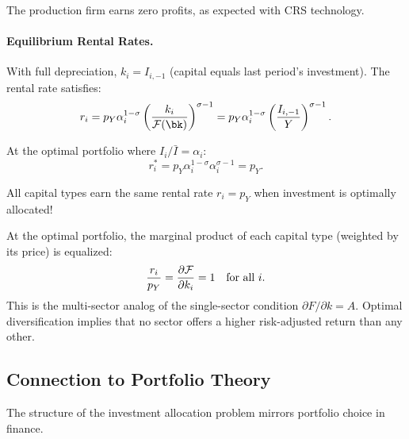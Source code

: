 The production firm earns zero profits, as expected with CRS technology.

\paragraph{Equilibrium Rental Rates.}
With full depreciation, $k_i = I_{i,-1}$ (capital equals last period's investment). The rental rate satisfies:
\begin{equation}
r_i = p_Y \alpha_i^{1-\sigma} \left( \frac{k_i}{\F(\bk)} \right)^{\sigma - 1} = p_Y \alpha_i^{1-\sigma} \left( \frac{I_{i,-1}}{Y} \right)^{\sigma - 1}.
\label{eq:ac-het-rental-eq}
\end{equation}

At the optimal portfolio where $I_i / \bar{I} = \alpha_i$:
\begin{equation}
r_i^* = p_Y \alpha_i^{1-\sigma} \alpha_i^{\sigma - 1} = p_Y.
\label{eq:ac-het-rental-star}
\end{equation}

All capital types earn the same rental rate $r_i = p_Y$ when investment is optimally allocated!

\begin{calloutimportant}
At the optimal portfolio, the marginal product of each capital type (weighted by its price) is equalized:
\[
\frac{r_i}{p_Y} = \frac{\partial \mathcal{F}}{\partial k_i} = 1 \quad \text{for all } i.
\]
This is the multi-sector analog of the single-sector condition $\partial F / \partial k = A$. Optimal diversification implies that no sector offers a higher risk-adjusted return than any other.
\end{calloutimportant}

\subsection{Connection to Portfolio Theory}
\label{subsec:ac-het-portfolio-theory}

The structure of the investment allocation problem mirrors portfolio choice in finance.

